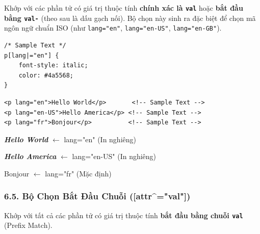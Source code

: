 \documentclass[11pt,oneside]{book}
\newcommand{\codeinline}[1]{\textcolor{accentOrange}{\texttt{#1}}}
\begin{document}
\begin{conceptBox}
Khớp với các phần tử có giá trị thuộc tính \textbf{chính xác là \codeinline{val}} hoặc \textbf{bắt đầu bằng \codeinline{val-}} (theo sau là dấu gạch nối). Bộ chọn này sinh ra đặc biệt để chọn mã ngôn ngữ chuẩn ISO (như \codeinline{lang="en"}, \codeinline{lang="en-US"}, \codeinline{lang="en-GB"}).
\end{conceptBox}

\begin{codeWindow}
\begin{lstlisting}[language=CSS3]
/* Sample Text */
p[lang|="en"] {
    font-style: italic;
    color: #4a5568;
}
\end{lstlisting}

\begin{lstlisting}[language=HTML5]
<p lang="en">Hello World</p>       <!-- Sample Text -->
<p lang="en-US">Hello America</p> <!-- Sample Text -->
<p lang="fr">Bonjour</p>          <!-- Sample Text -->
\end{lstlisting}
\end{codeWindow}

\begin{browserWindow}
\sffamily\small
\textit{\textcolor{gray!80}{\textbf{Hello World}}} \textcolor{gray!60}{\scriptsize $\leftarrow$ lang="en" (In nghiêng)} \par\vspace{2pt}
\textit{\textcolor{gray!80}{\textbf{Hello America}}} \textcolor{gray!60}{\scriptsize $\leftarrow$ lang="en-US" (In nghiêng)} \par\vspace{2pt}
Bonjour \textcolor{gray!60}{\scriptsize $\leftarrow$ lang="fr" (Mặc định)}
\end{browserWindow}

\subsubsection{6.5. Bộ Chọn Bắt Đầu Chuỗi ([attr\textasciicircum{}="val"])}

\begin{conceptBox}
Khớp với tất cả các phần tử có giá trị thuộc tính \textbf{bắt đầu bằng chuỗi \codeinline{val}} (Prefix Match).
\end{conceptBox}
\end{document}
